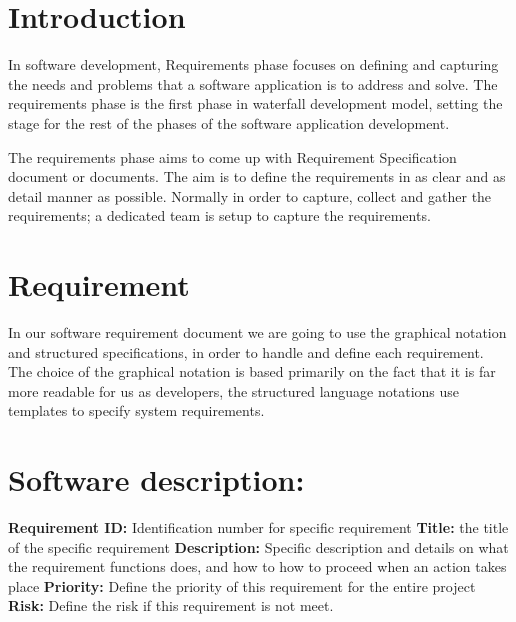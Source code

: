 

\section*{Introduction}
In software development, Requirements phase focuses on defining and capturing the needs and problems that a software application is to address and solve. The requirements phase is the first phase in waterfall development model, setting the stage for the rest of the phases of the software application development. 


The requirements phase aims to come up with Requirement Specification document or documents. The aim is to define the requirements in as clear and as detail manner as possible. Normally in order to capture, collect and gather the requirements; a dedicated team is setup to capture the requirements. 


\section*{Requirement}
In our software requirement document we are going to use the graphical notation and structured specifications, in order to handle and define each requirement. The choice of the graphical notation is based primarily on the fact that it is far more readable for us as developers, the structured language notations use templates to specify system
requirements.


\section*{Software description:}
\textbf{Requirement ID:} Identification number for specific requirement
\textbf{Title:} the title of the specific requirement
\textbf{Description:} Specific description and details on what the requirement functions does, and how to how to proceed when an action takes place
\textbf{Priority:} Define the priority of this requirement for the entire project
\textbf{Risk:} Define the risk if this requirement is not meet.


